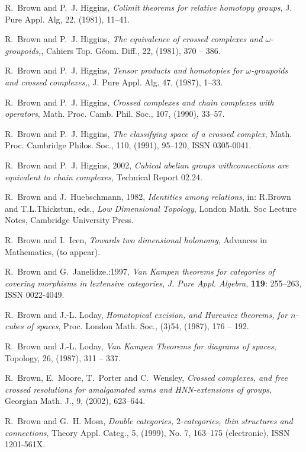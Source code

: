 \documentclass[12pt]{article}
\theoremstyle{definition}
\theoremstyle{remark}
\numberwithin{equation}{subsection}
\begin{document}
\begin{thebibliography}{99}
R.~Brown and P.~J. Higgins, {\em Colimit theorems for relative
homotopy groups\/}, J. Pure Appl. Alg, 22, (1981), 11--41.

R.~Brown and P.~J. Higgins, {\em The equivalence of crossed
complexes and  $\omega$-groupoids,\/}, Cahiers Top. G\'{e}om. Diff., 22, (1981), 370 -- 386.

R.~Brown and P.~J. Higgins, {\em Tensor products and homotopies
for $\omega$-groupoids and crossed complexes,\/}, J. Pure Appl. Alg, 47, (1987),
  1--33.

R.~Brown and P.~J. Higgins, {\em Crossed complexes and chain
complexes with
  operators\/}, Math. Proc. Camb. Phil. Soc., 107, (1990), 33--57.

R.~Brown and P.~J. Higgins, {\em The classifying space of a
crossed complex\/},
  Math. Proc. Cambridge Philos. Soc., 110, (1991), 95--120, ISSN 0305-0041.

R.~Brown and P.~J. Higgins, 2002, {\em Cubical abelian groups withconnections are equivalent to chain complexes}, Technical Report 02.24.

R.~Brown and J.~Huebschmann, 1982, {\em Identities among
relations}, in:  R.Brown and T.L.Thickstun, eds., {\em Low Dimensional Topology\/}, London
  Math. Soc Lecture Notes, Cambridge University Press.

R.~Brown and I.~{I}cen, {\em Towards two dimensional holonomy\/},
Advances in Mathematics,  (to appear).

R.~Brown and G.~Janelidze.:1997, {\em Van {K}ampen theorems for
categories of covering morphisms in lextensive categories\/}, \emph{J. Pure Appl. Algebra}, \textbf{119}:  255--263, ISSN 0022-4049.

R.~Brown and J.-L. Loday, {\em Homotopical excision, and Hurewicz
theorems, for $n$-cubes of spaces}, Proc. London Math. Soc., (3)54, (1987), 176 -- 192.

R.~Brown and J.-L. Loday, {\em Van Kampen Theorems for diagrams of
spaces\/}, Topology, 26, (1987), 311 -- 337.

R.~Brown, E.~Moore, T.~Porter and C.~Wensley, {\em Crossed
complexes, and free crossed resolutions for amalgamated sums and HNN-extensions of groups\/},
  Georgian Math. J., 9, (2002), 623--644.

R.~Brown and G.~H. Mosa, {\em Double categories, {$2$}-categories,
thin structures and connections\/}, Theory Appl. Categ., 5, (1999), No. 7,
  163--175 (electronic), ISSN 1201-561X.


\end{thebibliography}
\end{document}
